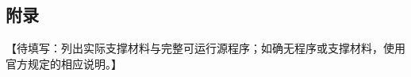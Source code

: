 \begin{appendices}

\section*{附录}
【待填写：列出实际支撑材料与完整可运行源程序；如确无程序或支撑材料，使用官方规定的相应说明。】

\end{appendices}
